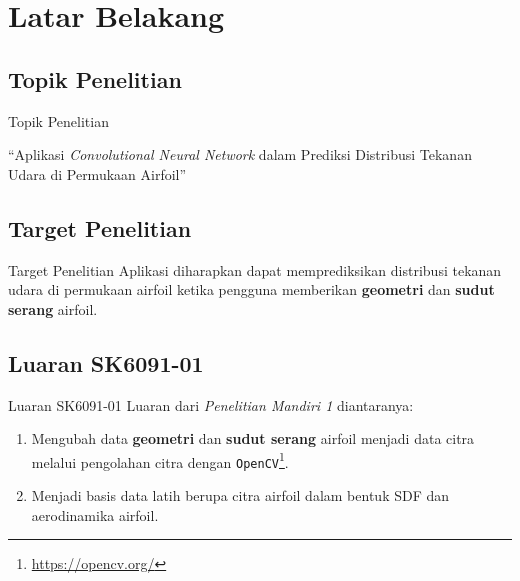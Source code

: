 \section{Latar Belakang}
\subsection{Topik Penelitian}
\begin{frame}{Topik Penelitian}
  \begin{center}
    \Large ``Aplikasi \textit{Convolutional Neural Network} dalam Prediksi Distribusi Tekanan Udara di Permukaan Airfoil''
  \end{center}
\end{frame}

\subsection{Target Penelitian}
\begin{frame}{Target Penelitian}
  Aplikasi diharapkan dapat memprediksikan distribusi tekanan udara di permukaan airfoil ketika pengguna memberikan \textbf{geometri} dan \textbf{sudut serang} airfoil.
\end{frame}

\subsection{Luaran SK6091-01}
\begin{frame}{Luaran SK6091-01}
  Luaran dari \textit{Penelitian Mandiri 1} diantaranya:
  \begin{enumerate}
    \item Mengubah data \textbf{geometri} dan \textbf{sudut serang} airfoil menjadi data citra melalui pengolahan citra dengan \texttt{OpenCV}\footnote{\url{https://opencv.org/}}.
    \pause
    \item Menjadi basis data latih berupa citra airfoil dalam bentuk SDF \cite{oleynikova2016signed} dan aerodinamika airfoil.
  \end{enumerate}
\end{frame}
